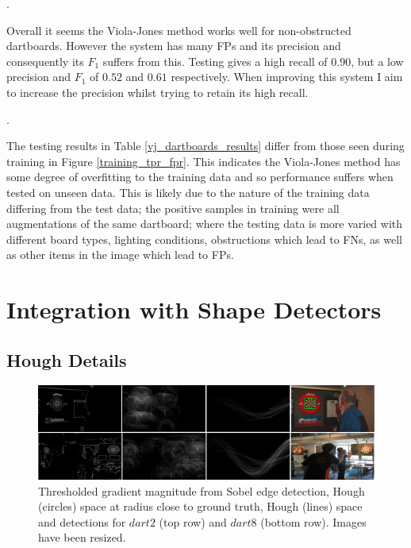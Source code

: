 \documentclass[11pt]{article}
\begin{document}
{\color{white}.}    

Overall it seems the Viola-Jones method works well for non-obstructed dartboards. However the system has many FPs and its precision and consequently its $F_1$ suffers from this. Testing gives a high recall of $0.90$, but a low precision and $F_1$ of $0.52$ and $0.61$ respectively. When improving this system I aim to increase the precision whilst trying to retain its high recall. 

{\color{white}.}

The testing results in Table \ref{vj_dartboards_results} differ from those seen during training in Figure \ref{training_tpr_fpr}. This indicates the Viola-Jones method has some degree of overfitting to the training data and so performance suffers when tested on unseen data. This is likely due to the nature of the training data differing from the test data; the positive samples in training were all augmentations of the same dartboard; where the testing data is more varied with different board types, lighting conditions, obstructions which lead to FNs, as well as other items in the image which lead to FPs.

\newpage

\section{Integration with Shape Detectors}

\subsection{Hough Details}
\label{hough_details}

\begin{figure}[h]
\centering
\includegraphics[width=0.95\linewidth]{figures/03_shape_detection/shape_detection_results.png}
\caption{Thresholded gradient magnitude from Sobel edge detection, Hough (circles) space at radius close to ground truth, Hough (lines) space and detections for $dart2$ (top row) and $dart8$ (bottom row). Images have been resized.}
\label{hough_images}
\end{figure}
\end{document}
